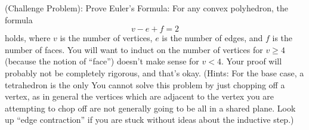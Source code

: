 (Challenge Problem): Prove Euler's Formula: For any convex polyhedron, the formula
\[v - e + f = 2\] holds, where $v$ is the number of vertices, $e$ is the number of edges, and $f$ is the number of faces. You will want to induct on the number of vertices for $v \geq 4$ (because the notion of ``face'') doesn't make sense for $v < 4$. Your proof will probably not be completely rigorous, and that's okay. (Hints: For the base case, a tetrahedron is the only You cannot solve this problem by just chopping off a vertex, as in general the vertices which are adjacent to the vertex you are attempting to chop off are not generally going to be all in a shared plane. Look up ``edge contraction'' if you are stuck without ideas about the inductive step.)